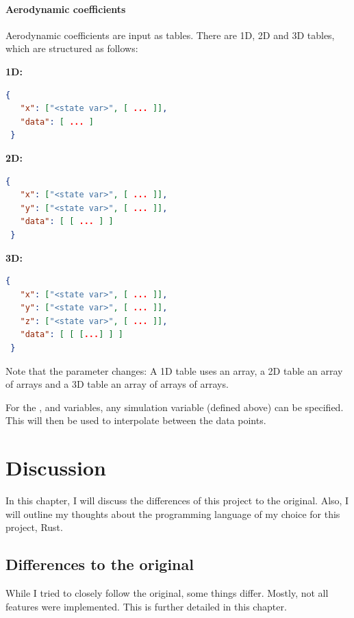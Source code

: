 \paragraph{Aerodynamic coefficients}

Aerodynamic coefficients are input as tables. There are 1D, 2D and 3D tables,
which are structured as follows:

\textbf{1D:}

\begin{lstlisting}[language=json]
 {
   "x": ["<state var>", [ ... ]],
   "data": [ ... ]
 }
\end{lstlisting}

\textbf{2D:}

\begin{lstlisting}[language=json]
 {
   "x": ["<state var>", [ ... ]],
   "y": ["<state var>", [ ... ]],
   "data": [ [ ... ] ]
 }
\end{lstlisting}

\textbf{3D:}

\begin{lstlisting}[language=json]
 {
   "x": ["<state var>", [ ... ]],
   "y": ["<state var>", [ ... ]],
   "z": ["<state var>", [ ... ]],
   "data": [ [ [...] ] ]
 }
\end{lstlisting}

Note that the  parameter changes: A 1D table uses an array, a 2D table an array
of arrays and a 3D table an array of arrays of arrays.

For the ,  and  variables, any simulation variable (defined above) can be specified.
This will then be used to interpolate between the data points.

\section{Discussion}\label{discussion}

In this chapter, I will discuss the differences of this project to the
original. Also, I will outline my thoughts about the programming language of
my choice for this project, Rust.

\subsection{Differences to the original}\label{differences-to-the-original}

While I tried to closely follow the original, some things differ. Mostly, not
all features were implemented. This is further detailed in this chapter.

